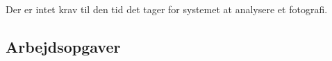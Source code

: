 \documentclass[12pt,a4paper,final]{report}
\begin{document}

Der er intet krav til den tid det tager for systemet at analysere et fotografi.












	
\subsection*{Arbejdsopgaver}
\end{document}
